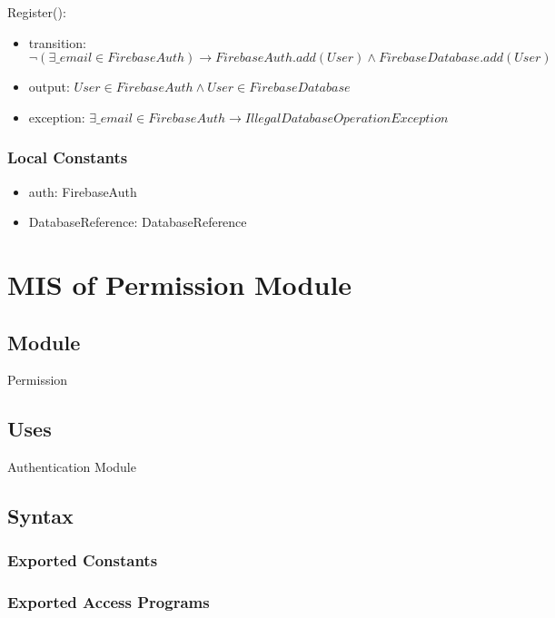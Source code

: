 \documentclass[12pt, titlepage]{article}
\begin{document}
\noindent Register():
\begin{itemize}
\item transition: $\lnot(\exists \_email \in FirebaseAuth) \rightarrow FirebaseAuth.add(User) \land FirebaseDatabase.add(User)$ 
\item output: $User \in FirebaseAuth \land User \in FirebaseDatabase$
\item exception: $\exists \_email \in FirebaseAuth \rightarrow IllegalDatabaseOperationException$
\end{itemize}

\subsubsection{Local Constants}

\begin{itemize}
  \item auth: FirebaseAuth
  \item DatabaseReference: DatabaseReference
\end{itemize}

\newpage

\section{MIS of Permission Module} \label{mPerm}

\subsection{Module}

Permission

\subsection{Uses}

Authentication Module

\subsection{Syntax}

\subsubsection{Exported Constants}

\subsubsection{Exported Access Programs}
\end{document}
